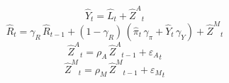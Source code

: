 \begin{dmath}
{{\hat{Y}}}_{t}={{\hat{L}}}_{t}+{{\hat{Z}^A}}_{t}
\end{dmath}
\begin{dmath}
{{\hat{R}}}_{t}={{\gamma_R}}\, {{\hat{R}}}_{t-1}+\left(1-{{\gamma_R}}\right)\, \left({{\hat{\pi}}}_{t}\, {{\gamma_\pi}}+{{\hat{Y}}}_{t}\, {{\gamma_Y}}\right)+{{\hat{Z}^M}}_{t}
\end{dmath}
\begin{dmath}
{{\hat{Z}^A}}_{t}={{\rho_A}}\, {{\hat{Z}^A}}_{t-1}+{{\varepsilon_A}}_{t}
\end{dmath}
\begin{dmath}
{{\hat{Z}^M}}_{t}={{\rho_M}}\, {{\hat{Z}^M}}_{t-1}+{{\varepsilon_M}}_{t}
\end{dmath}
